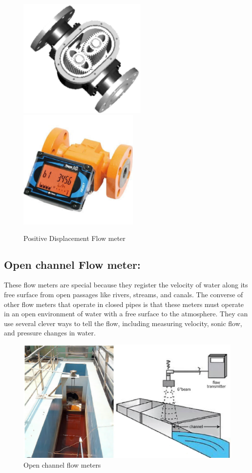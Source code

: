 \begin{figure}[h!]
    \centering
    \includegraphics[width=2.50105in,height=2.32in]{figs/flowmeters/image20.png}
    \includegraphics[width=2.33107in,height=2.32in]{figs/flowmeters/image21.png}
    \caption{Positive Displacement Flow meter}
    \label{fig:Positive Displacement Flow meter}
\end{figure}


\subsection{Open channel Flow meter:}
These flow meters are special because they register the velocity of water along its free surface from open passages like rivers, streams, and canals. The converse of other flow meters that operate in closed pipes is that these meters must operate in an open environment of water with a free surface to the atmosphere. They can use several clever ways to tell the flow, including measuring velocity, sonic flow, and pressure changes in water.


\begin{figure}[h!]
    \centering
    \includegraphics[width=0.8\linewidth]{figs/flowmeters/image22.png}
    \caption{Open channel flow meters}
    \label{fig:Open channel flow meters}
\end{figure}




